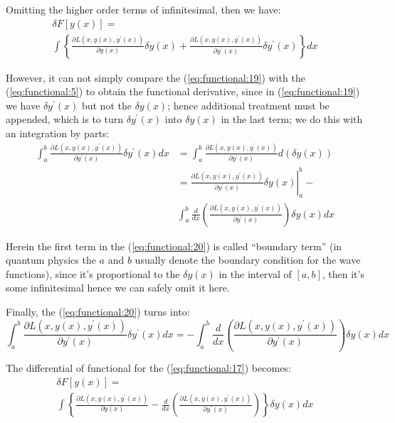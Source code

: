 Omitting the higher order terms of infinitesimal, then we have:
\begin{multline}
  \label{eq:functional:19}
\delta  F[ y(x)] =  \\
  \int \left\{ \frac{\partial L(x, y(x), y^{'}(x))} {\partial y(x)}
    \delta y(x) + \frac{\partial L(x, y(x), y^{'}(x))} {\partial
      y^{'}(x)} \delta y^{'}(x) \right\} dx
\end{multline}

However, it can not simply compare the (\ref{eq:functional:19}) with
the (\ref{eq:functional:5}) to obtain the functional derivative, since
in (\ref{eq:functional:19}) we have $ \delta y^{'}(x)$ but not the $
\delta y(x)$; hence additional treatment must be appended, which is to
turn $\delta y^{'}(x)$ into $\delta y(x)$ in the last term; we do this
with an integration by parts:
\begin{equation}
  \label{eq:functional:20}
  \begin{split}
    \int^{b}_{a} \frac{\partial L(x, y(x), y^{'}(x))} {\partial
      y^{'}(x)} \delta y^{'}(x) dx &= \int^{b}_{a} \frac{\partial L(x,
      y(x), y^{'}(x))}
    {\partial y^{'}(x)} d (\delta y(x)) \\
    &= \left. \frac{\partial L(x, y(x), y^{'}(x))}
      {\partial y^{'}(x)} \delta y(x) \right |^{b}_{a} -\\
    &\int^{b}_{a} \frac{d}{dx} \left(\frac{\partial L(x, y(x),
        y^{'}(x))} {\partial y^{'}(x)} \right) \delta y(x) dx
  \end{split}
\end{equation}

Herein the first term in the (\ref{eq:functional:20}) is called
``boundary term'' (in quantum physics the $a$ and $b$ usually denote
the boundary condition for the wave functions), since it's
proportional to the $\delta y(x)$ in the interval of $[a,b]$, then
it's some infinitesimal hence we can safely omit it here.

Finally, the (\ref{eq:functional:20}) turns into:
\begin{equation}
  \label{eq:functional:21}
  \int^{b}_{a} \frac{\partial L(x, y(x), y^{'}(x))} {\partial
    y^{'}(x)} \delta y^{'}(x) dx = - \int^{b}_{a} \frac{d}{dx}  
  \left(\frac{\partial L(x, y(x), y^{'}(x))}
    {\partial y^{'}(x)} \right) \delta y(x)  dx
\end{equation}

The differential of functional for the (\ref{eq:functional:17})
becomes:
\begin{multline}
  \label{eq:functional:22}
 \delta F[ y(x)] =  \\
  \int \left\{ \frac{\partial L(x, y(x), y^{'}(x))} {\partial y(x)} -
    \frac{d}{dx} \left(\frac{\partial L(x, y(x), y^{'}(x))} {\partial
        y^{'}(x)} \right) \right\} \delta y(x) dx
\end{multline}

